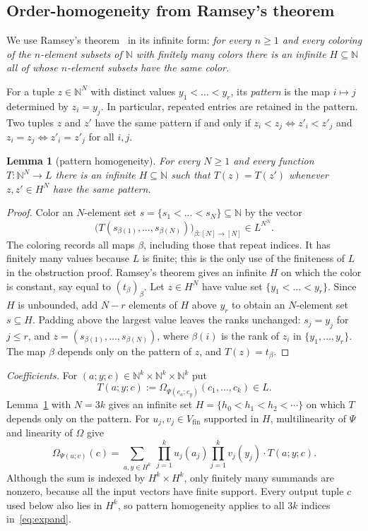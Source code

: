 \documentclass[11pt]{amsart}
\newtheorem{lemma}[theorem]{Lemma}
\theoremstyle{definition}
\theoremstyle{remark}
\numberwithin{equation}{section}
\newcommand{\N}{\mathbb N}
\theoremstyle{plain}
\theoremstyle{definition}
\theoremstyle{plain}
\begin{document}
\subsection{Order-homogeneity from Ramsey's theorem}
We use Ramsey's theorem~\cite{Ra} in its infinite form: \emph{for every $n\ge1$ and every coloring of the
$n$\nobreakdash-element subsets of $\N$ with finitely many colors there is an infinite $H\subseteq\N$ all of whose $n$\nobreakdash-element
subsets have the same color.}

For a tuple $z\in\N^N$ with distinct values $y_1<\dots<y_r$, its \emph{pattern} is the map
$i\mapsto j$ determined by $z_i=y_j$. In particular, repeated entries are retained in the pattern. Two tuples $z$
and $z'$ have the same pattern if and only if $z_i<z_j\Leftrightarrow z'_i<z'_j$ and $z_i=z_j\Leftrightarrow z'_i=z'_j$ for
all $i,j$.

\begin{lemma}[pattern homogeneity]\label{lem:H}
For every $N\ge1$ and every function $T\colon\N^N\to L$ there is an infinite $H\subseteq\N$ such that $T(z)=T(z')$
whenever $z,z'\in H^N$ have the same pattern.
\end{lemma}

\begin{proof}
Color an $N$\nobreakdash-element set $s=\{s_1<\dots<s_N\}\subseteq\N$ by the vector
\[
\bigl(T(s_{\beta(1)},\dots,s_{\beta(N)})\bigr)_{\beta\colon[N]\to[N]}\in L^{N^N}.
\]
The coloring records all maps $\beta$, including those that repeat indices. It has finitely many values because
$L$ is finite; this is the only use of the finiteness of $L$ in the obstruction proof. Ramsey's theorem gives an
infinite $H$ on which the color is constant, say equal to $(t_\beta)_\beta$. Let $z\in H^N$ have value set
$\{y_1<\dots<y_r\}$. Since $H$ is unbounded, add $N-r$ elements of $H$ above $y_r$ to obtain an
$N$\nobreakdash-element set $s\subseteq H$. Padding above the largest value leaves the ranks unchanged: $s_j=y_j$ for
$j\le r$, and
$z=(s_{\beta(1)},\dots,s_{\beta(N)})$, where $\beta(i)$ is the rank of $z_i$ in $\{y_1,\dots,y_r\}$. The map $\beta$
depends only on the pattern of $z$, and $T(z)=t_\beta$.
\end{proof}

\emph{Coefficients.} For $(a;y;c)\in\N^k\times\N^k\times\N^k$ put
\[
T(a;y;c):=\Omega_{\Psi(e_a;e_y)}(c_1,\dots,c_k)\in L .
\]
Lemma~\ref{lem:H} with $N=3k$ gives an infinite set $H=\{h_0<h_1<h_2<\cdots\}$ on which $T$ depends only on the pattern.
For $u_j,v_j\in V_{\mathrm{fin}}$ supported in $H$, multilinearity of $\Psi$ and linearity of $\Omega$ give
\begin{equation}\label{eq:expand}
\Omega_{\Psi(u;v)}(c)=\sum_{a,y\in H^k}\ \prod_{j=1}^ku_j(a_j)\prod_{j=1}^kv_j(y_j)\cdot T(a;y;c).
\end{equation}
Although the sum is indexed by $H^k\times H^k$, only finitely many summands are nonzero, because all the input
vectors have finite support. Every output tuple $c$ used below also lies in $H^k$, so pattern homogeneity applies to
all $3k$ indices in~\eqref{eq:expand}.
\end{document}
